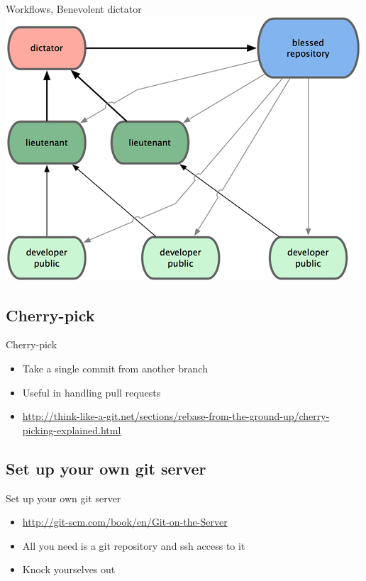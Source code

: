 \documentclass[10pt,a4paper]{beamer}
\begin{document}
\begin{frame}[plain]{Workflows, Benevolent dictator}
\includegraphics[width=\linewidth]{benevolentdictator.png}
\end{frame}

\subsection{Cherry-pick}
\begin{frame}{Cherry-pick}
\begin{itemize}
\item Take a single commit from another branch
\item Useful in handling pull requests
\item \href{http://think-like-a-git.net/sections/rebase-from-the-ground-up/cherry-picking-explained.html}{\color{blue}http://think-like-a-git.net/sections/rebase-from-the-ground-up/cherry-picking-explained.html}
\end{itemize}
\end{frame}

\subsection{Set up your own git server}
\begin{frame}{Set up your own git server}
\begin{itemize}
\item \href{http://git-scm.com/book/en/Git-on-the-Server}{\color{blue}http://git-scm.com/book/en/Git-on-the-Server}
\item All you need is a git repository and ssh access to it
\item Knock yourselves out
\end{itemize}
\end{frame}
\end{document}

